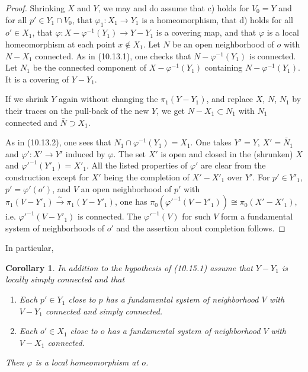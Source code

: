\documentclass[12pt,a4paper]{article}
\theoremstyle{plain}
\newtheorem{corollary}[theorem]{Corollary}
\theoremstyle{definition}
\theoremstyle{remark}
\begin{document}
\begin{proof}
Shrinking $X$ and $Y$, we may and do assume that c) holds for $V_0 = Y$ and for all $p' \in Y_1 \cap V_0$, that $\varphi_1 : X_1 \to Y_1$ is a homeomorphism, that d) holds for all $o' \in X_1$, that $\varphi : X - \varphi^{-1}(Y_1) \to Y - Y_1$ is a covering map, and that $\varphi$ is a local homeomorphism at each point $x \notin X_1$. Let $N$ be an open neighborhood of $o$ with $N - X_1$ connected. As in (10.13.1), one checks that $N - \varphi^{-1}(Y_1)$ is connected. Let $N_1$ be the connected component of $X - \varphi^{-1}(Y_1)$ containing $N - \varphi^{-1}(Y_1)$. It is a covering of $Y - Y_1$.

If we shrink $Y$ again without changing the $\pi_1(Y - Y_1)$, and replace $X$, $N$, $N_1$ by their traces on the pull-back of the new $Y$, we get $N - X_1 \subset N_1$ with $N_1$ connected and $\bar{N} \supset X_1$.

As in (10.13.2), one sees that $N_1 \cap \varphi^{-1}(Y_1) = X_1$. One takes $Y' = Y$, $X' = \bar{N}_1$ and $\varphi' : X' \to Y'$ induced by $\varphi$. The set $X'$ is open and closed in the (shrunken) $X$ and $\varphi'^{-1}(Y'_1) = X'_1$. All the listed properties of $\varphi'$ are clear from the construction except for $X'$ being the completion of $X' - X'_1$ over $Y'$. For $p' \in Y'_1$, $p' = \varphi'(o')$, and $V$ an open neighborhood of $p'$ with $\pi_1(V - Y'_1) \xrightarrow{\sim} \pi_1(Y - Y'_1)$, one has $\pi_0(\varphi'^{-1}(V - Y'_1)) \cong \pi_0(X' - X'_1)$, i.e. $\varphi'^{-1}(V - Y'_1)$ is connected. The $\varphi'^{-1}(V)$ for such $V$ form a fundamental system of neighborhoods of $o'$ and the assertion about completion follows.
\end{proof}

In particular,

\begin{corollary}
\label{10.15.4}
In addition to the hypothesis of (10.15.1) assume that $Y - Y_1$ is locally simply connected and that
\begin{enumerate}
\item[c')] Each $p' \in Y_1$ close to $p$ has a fundamental system of neighborhood $V$ with $V - Y_1$ connected and simply connected.
\item[d)] Each $o' \in X_1$ close to $o$ has a fundamental system of neighborhood $V$ with $V - X_1$ connected.
\end{enumerate}
Then $\varphi$ is a local homeomorphism at $o$.
\end{corollary}
\end{document}
